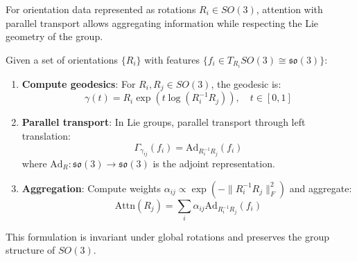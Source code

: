 \begin{example}\label{ex:attention_so3}
For orientation data represented as rotations $R_i \in SO(3)$, attention with parallel transport allows aggregating information while respecting the Lie geometry of the group.

Given a set of orientations $\{R_i\}$ with features $\{f_i \in T_{R_i}SO(3) \cong \mathfrak{so}(3)\}$:

\begin{enumerate}
    \item \textbf{Compute geodesics}: For $R_i, R_j \in SO(3)$, the geodesic is:
    \begin{equation}
    \gamma(t) = R_i \exp(t \log(R_i^{-1} R_j)), \quad t \in [0,1]
    \end{equation}

    \item \textbf{Parallel transport}: In Lie groups, parallel transport through left translation:
    \begin{equation}
    \Gamma_{\gamma_{ij}}(f_i) = \text{Ad}_{R_i^{-1}R_j}(f_i)
    \end{equation}
    where $\text{Ad}_R: \mathfrak{so}(3) \to \mathfrak{so}(3)$ is the adjoint representation.

    \item \textbf{Aggregation}: Compute weights $\alpha_{ij} \propto \exp(-\|R_i^{-1}R_j\|_F^2)$ and aggregate:
    \begin{equation}
    \text{Attn}(R_j) = \sum_i \alpha_{ij} \text{Ad}_{R_i^{-1}R_j}(f_i)
    \end{equation}
\end{enumerate}

This formulation is invariant under global rotations and preserves the group structure of $SO(3)$.
\end{example}
